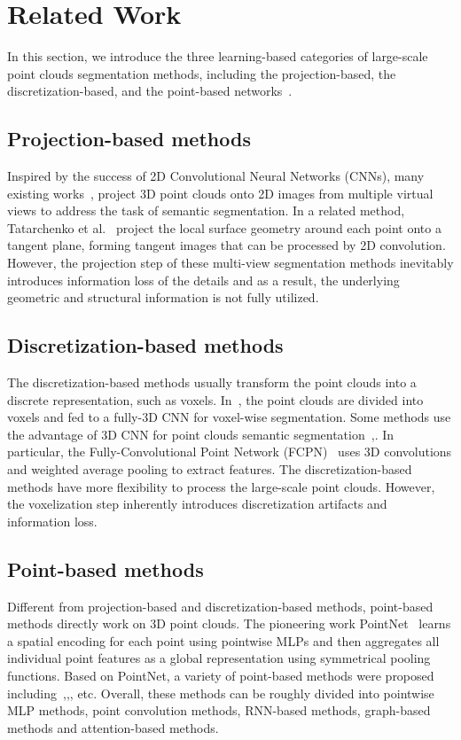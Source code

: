 \documentclass[review]{elsarticle}
\begin{document}
\section{Related Work}
In this section, we introduce the three learning-based categories of large-scale point clouds segmentation methods, including the projection-based, the discretization-based, and the point-based networks~\cite{9127813}.

\subsection{\textbf{Projection-based methods}}
Inspired by the success of 2D Convolutional Neural Networks (CNNs), many existing works~\cite{lawin2017deep},\cite{boulch2017unstructured} project 3D point clouds onto 2D images from multiple virtual views to address the task of semantic segmentation. In a related method, Tatarchenko et al.~\cite{tatarchenko2018tangent}
project the local surface geometry around each point onto a tangent plane, forming tangent images that can be processed by 2D convolution. However, the projection step of these multi-view segmentation methods inevitably introduces information loss of the details and as a result, the underlying geometric and structural information is not fully utilized.

\subsection{\textbf{Discretization-based methods}}
The discretization-based methods usually transform the point clouds into a discrete representation, such as voxels. In~\cite{huang2016point}, the point clouds are divided into voxels and fed to a fully-3D CNN for voxel-wise segmentation. Some methods use the advantage of 3D CNN for point clouds semantic segmentation~\cite{le2018pointgrid},\cite{meng2019vv}. In particular, the Fully-Convolutional Point Network (FCPN)~\cite{rethage2018fully} uses 3D convolutions and weighted average pooling to extract features. The discretization-based methods have more flexibility to process the large-scale point clouds. However, the voxelization step inherently introduces discretization artifacts and information loss.

\subsection{\textbf{Point-based methods}}
 Different from projection-based and discretization-based methods, point-based methods directly work on 3D point clouds. The pioneering work PointNet~\cite{qi2017pointnet} learns a spatial encoding for each point using pointwise MLPs and then aggregates all individual point features as a global representation using symmetrical pooling functions. Based on PointNet, a variety of point-based methods were proposed including~\cite{qi2017pointnet++},\cite{li2018pointcnn},\cite{hu2020randla}, etc. Overall, these methods can be roughly divided into pointwise MLP methods, point convolution methods, RNN-based methods, graph-based methods and attention-based methods.
\end{document}
